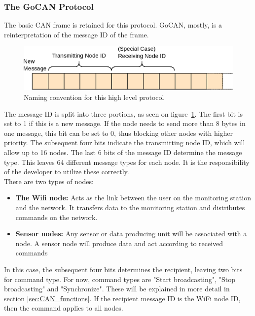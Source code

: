 \subsubsection*{The GoCAN Protocol}
The basic CAN frame is retained for this protocol.
GoCAN, mostly, is a reinterpretation of the message ID of the frame.

\begin{figure}[h!]
	\centering
	\includegraphics[width = 0.9\linewidth]{graphics/CAN_protocol_general}
	\caption{Naming convention for this high level protocol}
	\label{fig:CAN_protocol_general_pdf}
\end{figure}
The message ID is split into three portions, as seen on figure~\ref{fig:CAN_protocol_general_pdf}.
The first bit is set to 1 if this is a new message.
If the node needs to send more than 8 bytes in one message, this bit can be set to 0, thus blocking other nodes with higher priority.
The subsequent four bits indicate the transmitting node ID, which will allow up to 16 nodes. 
The last 6 bits of the message ID determine the message type. 
This leaves 64 different message types for each node.
It is the responsibility of the developer to utilize these correctly.\\

There are two types of nodes: 
\begin{itemize}
	\item \textbf{The Wifi node:} Acts as the link between the user on the monitoring station and the network.
	It transfers data to the monitoring station and distributes commands on the network.
	\item \textbf{Sensor nodes:} Any sensor or data producing unit will be associated with a node.
	A sensor node will produce data and act according to received commands
\end{itemize}


In this case, the subsequent four bits determines the recipient, leaving two bits for command type. 
For now, command types are "Start broadcasting", "Stop broadcasting" and "Synchronize".
These will be explained in more detail in section \ref{sec:CAN_functions}.
If the recipient message ID is the WiFi node ID, then the command applies to all nodes.\\

